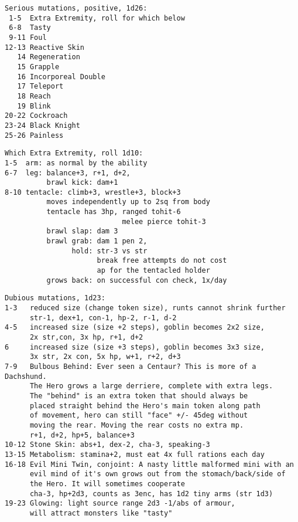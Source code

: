 \goodbreak \small \begin{samepage} \begin{verbatim}
Serious mutations, positive, 1d26:
 1-5  Extra Extremity, roll for which below
 6-8  Tasty
 9-11 Foul
12-13 Reactive Skin
   14 Regeneration
   15 Grapple
   16 Incorporeal Double
   17 Teleport
   18 Reach
   19 Blink
20-22 Cockroach
23-24 Black Knight
25-26 Painless
\end{verbatim} \end{samepage} \normalsize

\goodbreak \small \begin{samepage} \begin{verbatim}
Which Extra Extremity, roll 1d10:
1-5  arm: as normal by the ability
6-7  leg: balance+3, r+1, d+2,
          brawl kick: dam+1
8-10 tentacle: climb+3, wrestle+3, block+3
          moves independently up to 2sq from body
          tentacle has 3hp, ranged tohit-6
                            melee pierce tohit-3
          brawl slap: dam 3
          brawl grab: dam 1 pen 2,
                hold: str-3 vs str
                      break free attempts do not cost
                      ap for the tentacled holder
          grows back: on successful con check, 1x/day
\end{verbatim} \end{samepage} \normalsize

\goodbreak \small \begin{samepage} \begin{verbatim}
Dubious mutations, 1d23:
1-3   reduced size (change token size), runts cannot shrink further
      str-1, dex+1, con-1, hp-2, r-1, d-2
4-5   increased size (size +2 steps), goblin becomes 2x2 size,
      2x str,con, 3x hp, r+1, d+2
6     increased size (size +3 steps), goblin becomes 3x3 size,
      3x str, 2x con, 5x hp, w+1, r+2, d+3
7-9   Bulbous Behind: Ever seen a Centaur? This is more of a Dachshund.
      The Hero grows a large derriere, complete with extra legs.
      The "behind" is an extra token that should always be
      placed straight behind the Hero's main token along path
      of movement, hero can still "face" +/- 45deg without
      moving the rear. Moving the rear costs no extra mp.
      r+1, d+2, hp+5, balance+3
10-12 Stone Skin: abs+1, dex-2, cha-3, speaking-3
13-15 Metabolism: stamina+2, must eat 4x full rations each day
16-18 Evil Mini Twin, conjoint: A nasty little malformed mini with an
      evil mind of it's own grows out from the stomach/back/side of
      the Hero. It will sometimes cooperate
      cha-3, hp+2d3, counts as 3enc, has 1d2 tiny arms (str 1d3)
19-23 Glowing: light source range 2d3 -1/abs of armour,
      will attract monsters like "tasty"
\end{verbatim} \end{samepage} \normalsize

